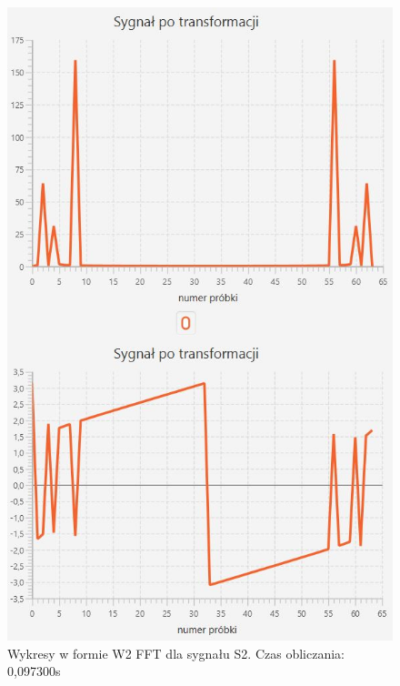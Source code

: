 \documentclass[12pt]{article}
\begin{document}
\begin{figure}[H]
	\centering
	\includegraphics[width=.8\linewidth]{FFT-S2-W2}
	\caption{ Wykresy w formie W2 FFT dla sygnału S2. Czas obliczania: 0,097300s}
	\label{S3_sygnal}
\end{figure}
\end{document}
